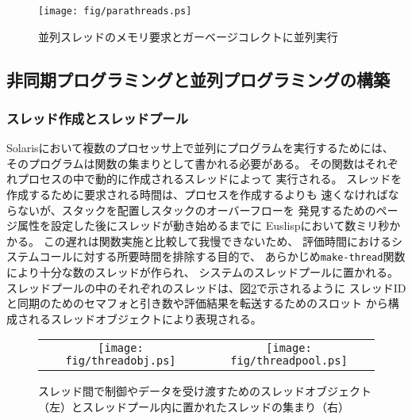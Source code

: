 \begin{figure}
\begin{center}
\texttt{[image: fig/parathreads.ps]}
\caption{並列スレッドのメモリ要求とガーベージコレクトに並列実行}\label{parathreads}
\end{center}
\end{figure}

\subsection{非同期プログラミングと並列プログラミングの構築}
\subsubsection{スレッド作成とスレッドプール}
Solarisにおいて複数のプロセッサ上で並列にプログラムを実行するためには、
そのプログラムは関数の集まりとして書かれる必要がある。
その関数はそれぞれプロセスの中で動的に作成されるスレッドによって
実行される。
スレッドを作成するために要求される時間は、プロセスを作成するよりも
速くなければならないが、スタックを配置しスタックのオーバーフローを
発見するためのページ属性を設定した後にスレッドが動き始めるまでに
Euslispにおいて数ミリ秒かかる。
この遅れは関数実施と比較して我慢できないため、
評価時間におけるシステムコールに対する所要時間を排除する目的で、
あらかじめ{\tt make-thread}関数により十分な数のスレッドが作られ、
システムのスレッドプールに置かれる。
スレッドプールの中のそれぞれのスレッドは、図\ref{threadobj}で示されるように
スレッドIDと同期のためのセマフォと引き数や評価結果を転送するためのスロット
から構成されるスレッドオブジェクトにより表現される。

\begin{figure}
\begin{center}
\begin{tabular}{c c}
\texttt{[image: fig/threadobj.ps]} &
\texttt{[image: fig/threadpool.ps]} \\
\end{tabular}
\end{center}
\caption{\label{threadobj}スレッド間で制御やデータを受け渡すためのスレッドオブジェクト（左）とスレッドプール内に置かれたスレッドの集まり（右）}
\end{figure}

